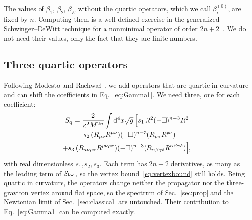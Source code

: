 \documentclass[aps,prd,10pt,twocolumn,superscriptaddress,nofootinbib,floatfix,longbibliography]{revtex4-2}
\newcommand{\dd}{\mathrm{d}}
\begin{document}
The values of $\beta_1$, $\beta_2$, $\beta_E$ without the quartic operators, which we call $\beta_i^{(0)}$, are fixed by $n$. Computing them is a well-defined exercise in the generalized Schwinger--DeWitt technique for a nonminimal operator of order $2n+2$~\cite{BarvinskyVilkovisky1985}. We do not need their values, only the fact that they are finite numbers.

\subsection{Three quartic operators}
\label{sec:killers}

Following Modesto and Rachwa{\l}~\cite{ModestoRachwal2014}, we add operators that are quartic in curvature and can shift the coefficients in Eq.~\eqref{eq:Gamma1}. We need three, one for each coefficient:
\begin{multline}
\label{eq:killers}
S_{\rm q}=\frac{2}{\kappa^2M^{2n}}\int\dd^4x\sqrt g\,\Bigl[s_1\,R^2(-\Box)^{n-3}R^2\\
+s_2\,(R_{\mu\nu}R^{\mu\nu})(-\Box)^{n-3}(R_{\rho\sigma}R^{\rho\sigma})\\
+s_3\,(R_{\mu\nu\rho\sigma}R^{\mu\nu\rho\sigma})(-\Box)^{n-3}(R_{\alpha\beta\gamma\delta}R^{\alpha\beta\gamma\delta})\Bigr],
\end{multline}
with real dimensionless $s_1,s_2,s_3$. Each term has $2n+2$ derivatives, as many as the leading term of $S_{\rm loc}$, so the vertex bound~\eqref{eq:vertexbound} still holds. Being quartic in curvature, the operators change neither the propagator nor the three-graviton vertex around flat space, so the spectrum of Sec.~\ref{sec:prop} and the Newtonian limit of Sec.~\ref{sec:classical} are untouched. Their contribution to Eq.~\eqref{eq:Gamma1} can be computed exactly.
\end{document}
